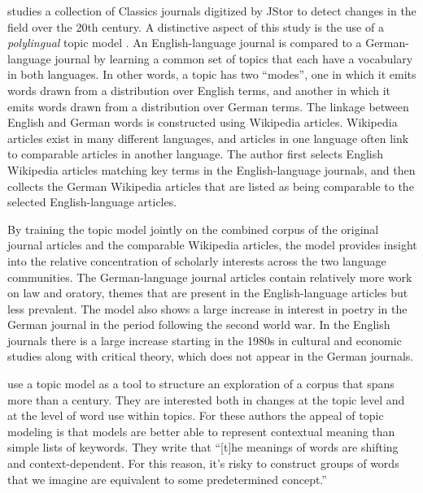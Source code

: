 \cite{mimno-12b} studies a collection of Classics journals digitized by JStor to detect changes in the field over the 20th century.
A distinctive aspect of this study is the use of a {\em polylingual} topic model \cite{mimno-09}.
An English-language journal is compared to a German-language journal by learning a common set of topics that each have a vocabulary in both languages.
In other words, a topic has two ``modes'', one in which it emits words drawn from a distribution over English terms, and another in which it emits words drawn from a distribution over German terms.
The linkage between English and German words is constructed using Wikipedia articles.
Wikipedia articles exist in many different languages, and articles in one language often link to comparable articles in another language.
The author first selects English Wikipedia articles matching key terms in the English-language journals, and then collects the German Wikipedia articles that are listed as being comparable to the selected English-language articles.

By training the topic model jointly on the combined corpus of the original journal articles and the comparable Wikipedia articles, the model provides insight into the relative concentration of scholarly interests across the two language communities.
The German-language journal articles contain relatively more work on law and oratory, themes that are present in the English-language articles but less prevalent.
The model also shows a large increase in  interest in poetry in the German journal in the period following the second world war.
In the English journals there is a large increase starting in the 1980s in cultural and economic studies along with critical theory, which does not appear in the German journals.

\cite{Goldstone-14} use a topic model as a tool to structure an exploration of a corpus that spans more than a century.
They are interested both in changes at the topic level and at the level of word use within topics.
For these authors the appeal of topic modeling is that models are better able to represent contextual meaning than simple lists of keywords. They write that ``[t]he meanings
of words are shifting and context-dependent. For this reason, it’s risky to
construct groups of words that we imagine are equivalent to some predetermined
concept.''

